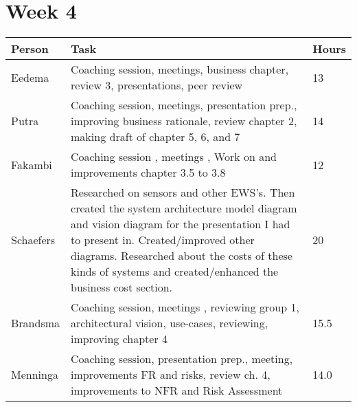 \section{Week 4}
\begin{tabular}{p{} p{} p{}}
   \textbf{Person} & \textbf{Task} & \textbf{Hours} \\ \midrule
	Eedema & Coaching session, meetings, business chapter, review 3, presentations, peer review &13  \\ \midrule
	Putra & Coaching session, meetings, presentation prep., improving business rationale, review chapter 2, making draft of chapter 5, 6, and 7 & 14 \\ \midrule
	Fakambi & Coaching session , meetings , Work on and improvements chapter 3.5 to 3.8 & 12 \\ \midrule
	Schaefers & Researched on sensors and other EWS's. Then created the system architecture model diagram and vision diagram for the presentation I had to present in. Created/improved other diagrams. Researched about the costs of these kinds of systems and created/enhanced the business cost section. & 20 \\ \midrule
	Brandsma & Coaching session, meetings , reviewing group 1, architectural vision, use-cases, reviewing, improving chapter 4 & 15.5\\ \midrule
	Menninga & Coaching session, presentation prep., meeting, improvements FR and risks, review ch. 4, improvements to NFR and Risk Assessment & 14.0 \\ \midrule
\end{tabular}

